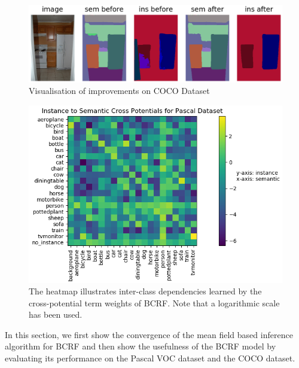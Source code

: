 





\begin{figure}[t]
	\begin{center}
		\includegraphics[width=\linewidth]{figs/stuff_vis.png}
	\end{center}
	\vspace{-0.5cm}
	\caption{Visualisation of improvements on COCO Dataset}
	\label{fig:vis}
	\vspace{0.5cm}
\end{figure}


\begin{figure}[t]
	\begin{center}
		\includegraphics[width=0.8\linewidth]{figs/ins_to_sem.png}
	\end{center}
	\vspace{-0.4cm}
	\caption{The heatmap illustrates inter-class dependencies learned by the cross-potential term weights of BCRF. Note that a logarithmic scale has been used. }
	\label{fig:potentials}
	\vspace{0.5cm}
\end{figure}

In this section, we first show the convergence of the mean field based inference algorithm for BCRF and then show the usefulness of the BCRF model by evaluating its performance on the Pascal VOC dataset and the COCO dataset.

